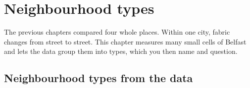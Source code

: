 \chapter{Neighbourhood types}\label{ch:types}

The previous chapters compared four whole places. Within one city, fabric changes from street to street. This chapter measures many small cells of Belfast and lets the data group them into types, which you then name and question.

\section{Neighbourhood types from the data}

